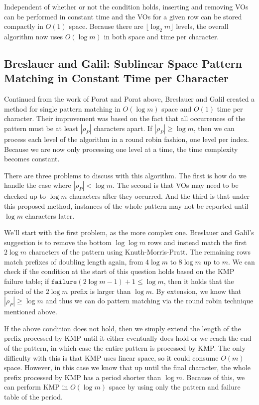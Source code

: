 \documentclass[ %
                    author={Dominic Joseph Moylett},
                    degree={MEng},
                     title={Dictionary Matching with Fingerprints},
                  subtitle={An Empirical Analysis},
                      type={research},
                      year={2015} ]{dissertation}
\begin{document}
Independent of whether or not the condition holds, inserting and removing VOs can be performed in constant time and the VOs for a given row can be stored compactly in $O(1)$ space. Because there are $\lfloor\log_2m\rfloor$ levels, the overall algorithm now uses $O(\log m)$ in both space and time per character.

\subsection{Breslauer and Galil: Sublinear Space Pattern Matching in Constant Time per Character}
\label{ssec:breslauer-galil}

Continued from the work of Porat and Porat above, Breslauer and Galil\cite{Breslauer:2014:RSS:2660854.2635814} created a method for single pattern matching in $O(\log m)$ space and $O(1)$ time per character. Their improvement was based on the fact that all occurrences of the pattern must be at least $|\rho_P|$ characters apart. If $|\rho_P| \geq \log m$, then we can process each level of the algorithm in a round robin fashion, one level per index. Because we are now only processing one level at a time, the time complexity becomes constant.

There are three problems to discuss with this algorithm. The first is how do we handle the case where $|\rho_P| < \log m$. The second is that VOs may need to be checked up to $\log m$ characters after they occurred. And the third is that under this proposed method, instances of the whole pattern may not be reported until $\log m$ characters later.

We'll start with the first problem, as the more complex one. Breslauer and Galil's suggestion is to remove the bottom $\log\log m$ rows and instead match the first $2\log m$ characters of the pattern using Knuth-Morris-Pratt\cite{kmp}. The remaining rows match prefixes of doubling length again, from $4\log m$ to $8\log m$ up to $m$. We can check if the condition at the start of this question holds based on the KMP failure table; if $\texttt{failure}(2\log m - 1) + 1 \leq \log m$, then it holds that the period of the $2\log m$ prefix is larger than $\log m$. By extension, we know that $|\rho_P| \geq \log m$ and thus we can do pattern matching via the round robin technique mentioned above.

If the above condition does not hold, then we simply extend the length of the prefix processed by KMP until it either eventually does hold or we reach the end of the pattern, in which case the entire pattern is processed by KMP. The only difficulty with this is that KMP uses linear space, so it could consume $O(m)$ space. However, in this case we know that up until the final character, the whole prefix processed by KMP has a period shorter than $\log m$. Because of this, we can perform KMP in $O(\log m)$ space by using only the pattern and failure table of the period.
\end{document}
